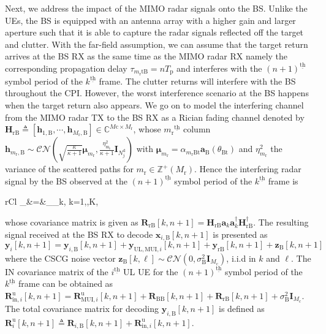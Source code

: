 \documentclass[conference]{IEEEtran}
\newcommand{\paren}[1]{\left({#1}\right)}
\newcommand{\bracket}[1]{{\left [{#1}\right ]}}
\newcommand{\ith}[1]    {{#1}^{\underline{\text{th}}}}
\newcommand{\rr}{_\mathrm{r}}
\newcommand{\cc}{_\mathrm{c}}
\newcommand{\B}{\mathrm{B}}
\begin{document}
Next, we address the impact of the MIMO radar signals onto the BS. Unlike the UEs, the BS is equipped with an antenna array with a higher gain and larger aperture such that it is able to capture the radar signals reflected off the target and clutter. With the far-field assumption, we can assume that the target return arrives at the BS RX as the same time as the MIMO radar RX namely the corresponding propagation delay $\tau_{m\rr \mathrm{tB}}=nT_\mathrm{p}$ and interferes with the $\ith{\paren{n+1}}$ symbol period of the $\ith{k}$ frame. The clutter returns will interfere with the BS throughout the CPI. However, the worst interference scenario at the BS happens when the target return also appears. We go on to model the interfering channel from the MIMO radar TX to the BS RX as a Rician fading channel denoted by $\mathbf{H}_{\mathrm{rB}}\triangleq\bracket{\mathbf{h}_{1,\mathrm{B}},\cdots,\mathbf{h}_{M\rr,\mathrm{B}}}\in\mathbb{C}^{M\mathrm{c}\times M\rr}$, whose $\ith{m\rr}$ column $\mathbf{h}_{m\rr,\mathrm{B}}\sim\mathcal{CN}\paren{\sqrt{\frac{\kappa}{\kappa+1}}\boldsymbol{\mu}_{m\rr},\frac{\eta^2_\mathrm{m\rr}}{\kappa+1}\mathbf{I}_{N^{\text{d}}_j}}$ with $\boldsymbol{\mu}_{m\rr}=\alpha_{m_\mathrm{r}\mathrm{Bt}}\mathbf{a}_{\mathrm{B}}(\theta_{\mathrm{Bt}})$ and $\eta^2_{m\rr}$ the variance of the scattered paths for $m\rr\in\mathbb{Z}^+(M\rr)$. Hence the interfering radar signal by the BS observed at the $\ith{\paren{n+1}}$ symbol period of the $\ith{k}$ frame is\par\noindent\small
	\begin{IEEEeqnarray}{rCl}
		_{}\bracket{k,n+1}&=&_{}_k,\; k=1,\cdots,K,
	\end{IEEEeqnarray}\normalsize
whose covariance matrix is given as $\mathbf{R}_{\mathrm{rB}}\bracket{k,n+1}=\mathbf{H}_{\mathrm{rB}}\mathbf{a}_k\mathbf{a}^\dagger_k\mathbf{H}^\dagger_{\mathrm{rB}}$. The resulting signal received at the BS RX to decode $\mathbf{x}_{i,\B}\bracket{k,n+1}$ is presented as  $\mathbf{y}_{i}\bracket{k,n+1}=\mathbf{y}_{i,\B}\bracket{k,n+1}+\mathbf{y}_{\mathrm{UL,MUI},i}\bracket{k,n+1}+\mathbf{y}_{\mathrm{rB}}\bracket{k,n+1}+\mathbf{z}_\mathrm{B}\bracket{k,n+1}$
where the CSCG noise vector $\mathbf{z}_\mathrm{B}\bracket{k,\ell}\sim\mathcal{CN}\paren{0,\sigma^2_{\mathrm{B}}\mathbf{I}_{M\cc}}$, i.i.d in $k$ and $\ell$. The IN covariance matrix of the $\ith{i}$ UL UE for the $\ith{\paren{n+1}}$ symbol period of the $\ith{k}$ frame can be obtained as $\mathbf{R}^\text{u}_{\mathrm{in},i}\bracket{k,n+1}=\mathbf{R}^\text{u}_{\mathrm{MUI}, i}\bracket{k,n+1}+\mathbf{R}_{\mathrm{BB}}\bracket{k,n+1}+\mathbf{R}_{\mathrm{rB}}\bracket{k,n+1}+\sigma^2_{\mathrm{B}}\mathbf{I}_{M\cc}$. The total covariance matrix for decoding $\mathbf{y}_{i,\B}\bracket{k,n+1}$ is defined as $\mathbf{R}^\mathrm{u}_{i}\bracket{k,n+1}\triangleq\mathbf{R}_{i,\B}\bracket{k,n+1}+\mathbf{R}^\text{u}_{\mathrm{in},i}\bracket{k,n+1}$. 
\end{document}
